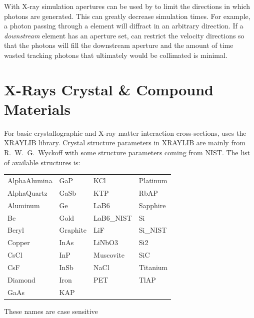 With X-ray simulation apertures can be used by \bmad to limit the
directions in which photons are generated. This can greatly decrease
simulation times. For example, a photon passing through a
 element will diffract in an arbitrary
direction. If a {\em downstream} element has an aperture set, \bmad
can restrict the velocity directions so that the photons will fill the
downstream aperture and the amount of time wasted tracking photons
that ultimately would be collimated is minimal.

\section{X-Rays Crystal \& Compound Materials}
\label{s:cryst.list}

For basic crystallographic and X-ray matter interaction cross-sections,
\bmad uses the XRAYLIB\cite{b:xraylib} library. Crystal structure
parameters in XRAYLIB are mainly from R.~W.~G.~Wyckoff\cite{b:wyckoff}
with some structure parameters coming from NIST. The list of available
structures is:
\begin{center}
\begin{tabular}{llll}
AlphaAlumina & GaP       & KCl        & Platinum  \\
AlphaQuartz  & GaSb      & KTP        & RbAP      \\
Aluminum     & Ge        & LaB6       & Sapphire  \\
Be           & Gold      & LaB6_NIST  & Si        \\
Beryl        & Graphite  & LiF        & Si_NIST   \\
Copper       & InAs      & LiNbO3     & Si2       \\
CsCl         & InP       & Muscovite  & SiC       \\
CsF          & InSb      & NaCl       & Titanium  \\
Diamond      & Iron      & PET        & TlAP      \\
GaAs         & KAP       &            &           \\
\end{tabular}
\end{center}
These names are case sensitive

